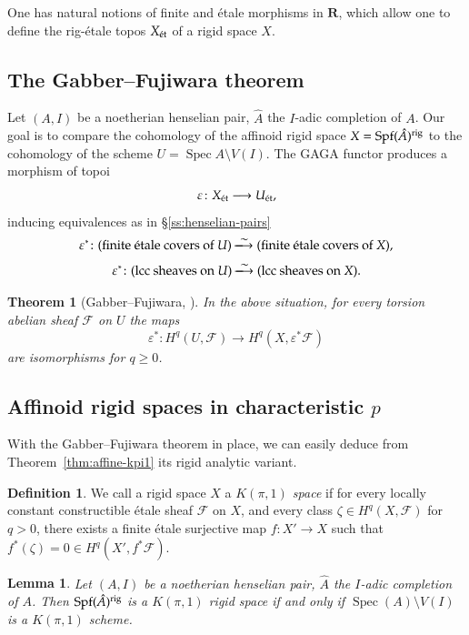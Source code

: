 \documentclass[twoside]{amsart}
\newcommand{\RR}{\mathbf{R}}
\newcommand{\Ff}{\mathscr{F}}
\newcommand{\et}{{\rm\acute{e}t}}
\newcommand{\rig}{{\rm rig}}
\DeclareMathOperator{\Spec}{Spec}
\DeclareMathOperator{\Spf}{Spf}
\renewcommand{\to}{\longrightarrow}
\newcommand*\isomlong{%
 		\xlongrightarrow{\raisebox{-0.2 em}{\smash{\ensuremath{\sim}}}}%
	}
\theoremstyle{plain}
\newtheorem{lemma}[subsubsection]{Lemma}
\newtheorem{theorem}[subsubsection]{Theorem}
\theoremstyle{definition}
\newtheorem{definition}[subsubsection]{Definition}
\theoremstyle{remark}
\numberwithin{equation}{subsection}
\begin{document}
One has natural notions of finite and \'etale morphisms in $\RR$, which allow one to define the rig-\'etale topos $X_{\et}$ of a rigid space $X$. 

\subsection{The Gabber--Fujiwara theorem}
\label{ss:gabber-fujiwara}

Let $(A, I)$ be a noetherian henselian pair, $\hat A$ the $I$-adic completion of $A$. Our goal is to compare the cohomology of the affinoid rigid space $X=\Spf(\hat A)^\rig$ to the cohomology of the scheme $U=\Spec A \setminus V(I)$. The GAGA functor \cite[Chap. VII]{AbbesRigid} produces a morphism of topoi
\[ 
	\varepsilon\colon X_\et \to U_\et,
\]
inducing equivalences as in \S\ref{ss:henselian-pairs}
\[ 
	\varepsilon^* \colon (\text{finite \'etale covers of }U)
	\isomlong 
	(\text{finite \'etale covers of }X),
\]
\[ 
	\varepsilon^* \colon (\text{lcc sheaves on }U)
	\isomlong 
	(\text{lcc sheaves on }X).
\]

\begin{theorem}[{Gabber--Fujiwara, \cite[Corollary 6.6.3]{Fujiwara}}] \label{thm:gab-fuj}
	In the above situation, for every torsion abelian sheaf $\Ff$ on $U$ the maps
	\[ 
		\varepsilon^*\colon H^q(U, \Ff) \to H^q(X, \varepsilon^*\Ff)
	\]
	are isomorphisms for $q\geq 0$.
\end{theorem}

\subsection{Affinoid rigid spaces in characteristic $p$}

With the Gabber--Fujiwara theorem in place, we can easily deduce from Theorem~\ref{thm:affine-kpi1} its rigid analytic variant.

\begin{definition} \label{def:rigid-kpi1}
	We call a rigid space $X$ a \emph{$K(\pi, 1)$ space} if for every locally constant constructible \'etale sheaf $\Ff$ on $X$, and every class $\zeta \in H^q(X, \Ff)$ for $q>0$, there exists a finite \'etale surjective map $f\colon X'\to X$ such that $f^*(\zeta) = 0 \in H^q(X', f^* \Ff)$.
\end{definition}

\begin{lemma} \label{lemma:kpi1rigid}
	Let $(A, I)$ be a noetherian henselian pair, $\hat A$ the $I$-adic completion of $A$. Then $\Spf(\hat A)^\rig$ is a $K(\pi, 1)$ rigid space if and only if $\Spec(A)\setminus V(I)$ is a $K(\pi, 1)$ scheme.
\end{lemma}
\end{document}
